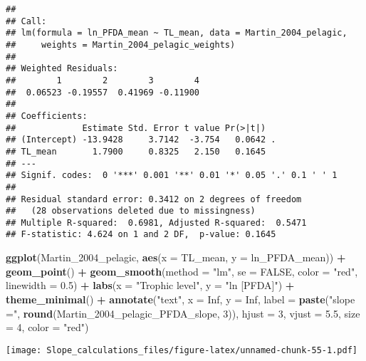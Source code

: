 \documentclass[
]{article}
\newenvironment{Shaded}{\begin{snugshade}}{\end{snugshade}}
\newcommand{\AttributeTok}[1]{\textcolor[rgb]{0.13,0.29,0.53}{#1}}
\newcommand{\ConstantTok}[1]{\textcolor[rgb]{0.56,0.35,0.01}{#1}}
\newcommand{\DecValTok}[1]{\textcolor[rgb]{0.00,0.00,0.81}{#1}}
\newcommand{\FloatTok}[1]{\textcolor[rgb]{0.00,0.00,0.81}{#1}}
\newcommand{\FunctionTok}[1]{\textcolor[rgb]{0.13,0.29,0.53}{\textbf{#1}}}
\newcommand{\NormalTok}[1]{#1}
\newcommand{\SpecialCharTok}[1]{\textcolor[rgb]{0.81,0.36,0.00}{\textbf{#1}}}
\newcommand{\StringTok}[1]{\textcolor[rgb]{0.31,0.60,0.02}{#1}}
\begin{document}
\begin{verbatim}
## 
## Call:
## lm(formula = ln_PFDA_mean ~ TL_mean, data = Martin_2004_pelagic, 
##     weights = Martin_2004_pelagic_weights)
## 
## Weighted Residuals:
##        1        2        3        4 
##  0.06523 -0.19557  0.41969 -0.11900 
## 
## Coefficients:
##             Estimate Std. Error t value Pr(>|t|)  
## (Intercept) -13.9428     3.7142  -3.754   0.0642 .
## TL_mean       1.7900     0.8325   2.150   0.1645  
## ---
## Signif. codes:  0 '***' 0.001 '**' 0.01 '*' 0.05 '.' 0.1 ' ' 1
## 
## Residual standard error: 0.3412 on 2 degrees of freedom
##   (28 observations deleted due to missingness)
## Multiple R-squared:  0.6981, Adjusted R-squared:  0.5471 
## F-statistic: 4.624 on 1 and 2 DF,  p-value: 0.1645
\end{verbatim}

\begin{Shaded}
\begin{Highlighting}[]
\FunctionTok{ggplot}\NormalTok{(Martin\_2004\_pelagic, }\FunctionTok{aes}\NormalTok{(}\AttributeTok{x =}\NormalTok{ TL\_mean, }\AttributeTok{y =}\NormalTok{ ln\_PFDA\_mean)) }\SpecialCharTok{+}
  \FunctionTok{geom\_point}\NormalTok{() }\SpecialCharTok{+}
  \FunctionTok{geom\_smooth}\NormalTok{(}\AttributeTok{method =} \StringTok{"lm"}\NormalTok{, }\AttributeTok{se =} \ConstantTok{FALSE}\NormalTok{, }\AttributeTok{color =} \StringTok{"red"}\NormalTok{, }\AttributeTok{linewidth =} \FloatTok{0.5}\NormalTok{) }\SpecialCharTok{+}
  \FunctionTok{labs}\NormalTok{(}\AttributeTok{x =} \StringTok{"Trophic level"}\NormalTok{,}
       \AttributeTok{y =} \StringTok{"ln [PFDA]"}\NormalTok{) }\SpecialCharTok{+}
  \FunctionTok{theme\_minimal}\NormalTok{() }\SpecialCharTok{+}
  \FunctionTok{annotate}\NormalTok{(}\StringTok{"text"}\NormalTok{, }\AttributeTok{x =} \ConstantTok{Inf}\NormalTok{, }\AttributeTok{y =} \ConstantTok{Inf}\NormalTok{, }\AttributeTok{label =} \FunctionTok{paste}\NormalTok{(}\StringTok{"slope ="}\NormalTok{, }\FunctionTok{round}\NormalTok{(Martin\_2004\_pelagic\_PFDA\_slope, }\DecValTok{3}\NormalTok{)), }
           \AttributeTok{hjust =} \DecValTok{3}\NormalTok{, }\AttributeTok{vjust =} \FloatTok{5.5}\NormalTok{, }\AttributeTok{size =} \DecValTok{4}\NormalTok{, }\AttributeTok{color =} \StringTok{"red"}\NormalTok{)}
\end{Highlighting}
\end{Shaded}

\texttt{[image: Slope\_calculations\_files/figure-latex/unnamed-chunk-55-1.pdf]}
\end{document}
